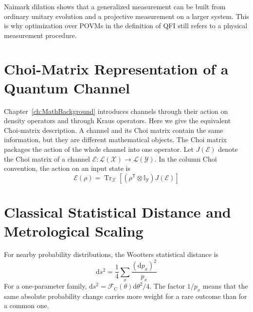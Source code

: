 \begin{remark}
    Naimark dilation shows that a generalized measurement can be built from ordinary unitary evolution and a projective measurement on a larger system.  This is why optimization over POVMs in the definition of QFI still refers to a physical measurement procedure.
\end{remark}

\section{Choi-Matrix Representation of a Quantum Channel}
\label{sec:choi_quantum_channel}

Chapter~\ref{ch:MathBackground} introduces channels through their action on density operators and through Kraus operators.  Here we give the equivalent Choi-matrix description.  A channel and its Choi matrix contain the same information, but they are different mathematical objects.  The Choi matrix packages the action of the whole channel into one operator.  Let $J(\mathcal{E})$ denote the Choi matrix of a channel $\mathcal{E}:\mathcal{L}(\mathcal{X})\rightarrow\mathcal{L}(\mathcal{Y})$.  In the column Choi convention, the action on an input state is~\cite{wood2015graphical}
\begin{equation}
    \mathcal{E}(\rho)
    =\operatorname{Tr}_{\mathcal{X}}\!\left[
        (\rho^{\mathsf{T}}\otimes\mathbb{I}_{\mathcal{Y}})
        J(\mathcal{E})
        \right]
    \label{eq:choi_channel_action}
\end{equation}


\section{Classical Statistical Distance and Metrological Scaling}

\begin{definition}
    For nearby probability distributions, the Wootters statistical distance is
    \begin{equation}
        \mathrm{d}s^2=\frac{1}{4}\sum_x\frac{(\mathrm{d}p_x)^2}{p_x}
    \end{equation}
    For a one-parameter family, $\mathrm{d}s^2=\mathcal{F}_{\mathrm{C}}(\theta)\mathrm{d}\theta^2/4$.  The factor $1/p_x$ means that the same absolute probability change carries more weight for a rare outcome than for a common one.
\end{definition}

